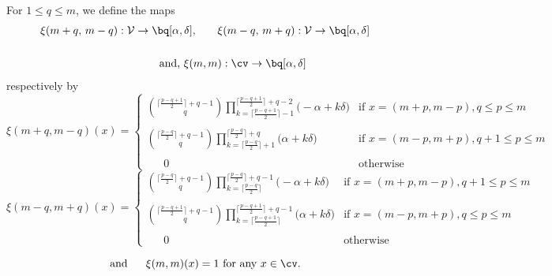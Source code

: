 \documentclass[10pt, a4paper, reqno]{amsart}
\begin{document}
	\begin{defe}\label{ktclasses}
		For $1\leq q\leq m$, we define the maps
		\begin{align*}
	\xi(m+q,\,m-q) : \mathcal{V} \to \bq[\alpha,\delta], 
\qquad &
\xi(m-q,\,m+q) : \mathcal{V} \to \bq[\alpha,\delta]\\
&\\
\text{and, } \xi(m,m&):\cv \to \bq[\alpha,\delta]
		\end{align*}
		 respectively by
		\begin{equation}\label{eq:xi_plus_minus}
		\xi(m+q,m-q)(x)=
		\begin{cases}
		\displaystyle	\binom{\lceil \frac{p-q+1}{2} \rceil + q-1}{\,q\,}\prod_{k=\lceil \frac{p-q+1}{2} \rceil -1}^{\lceil \frac{p-q+1}{2} \rceil +q-2}\Big(-\alpha +k\delta\Big)                  &      \text{if $x=(m+p,m-p), q\leq p\leq m$}  \\		
			&\\
		\displaystyle	\binom{\lceil \frac{p-q}{2} \rceil+ q-1}{\,q\,}\prod_{k=\lceil \frac{p-q}{2} \rceil+1}^{\lceil \frac{p-q}{2} \rceil+q}\Big(\alpha+k\delta \Big)  &      \text{if $x=(m-p,m+p), q+1\leq p\leq m$}  \\
			&\\
			~~~~~~~0&      \text{otherwise}  
		\end{cases}
	\end{equation}
		\begin{equation}\label{eq:xi_minus_plus}
		\xi(m-q,m+q)(x)=
		\begin{cases}
		\displaystyle	\binom{\lceil \frac{p-q}{2} \rceil + q-1}{\,q\,}\prod_{k=\lceil \frac{p-q}{2} \rceil}^{\lceil \frac{p-q}{2} \rceil +q-1}\Big(-\alpha +k\delta\Big)                   &      \text{if $x=(m+p,m-p), q+1\leq p\leq m$}  \\		
			&\\
			\displaystyle\binom{\lceil \frac{p-q+1}{2} \rceil+ q-1}{\,q\,}\prod_{k=\lceil \frac{p-q+1}{2} \rceil}^{\lceil \frac{p-q+1}{2} \rceil+q-1 }\Big(\alpha+k\delta \Big)&      \text{if $x=(m-p,m+p), q\leq p\leq m$}  \\
			&\\
			~~~~~~~0&      \text{otherwise}  
		\end{cases}
			\end{equation}

				\begin{equation}\label{eq:xi_mm}
			\text{and }~~~~	\xi(m,m)(x)=1 \text{ for any } x\in\cv.
			\end{equation}
	\end{defe}
\end{document}
